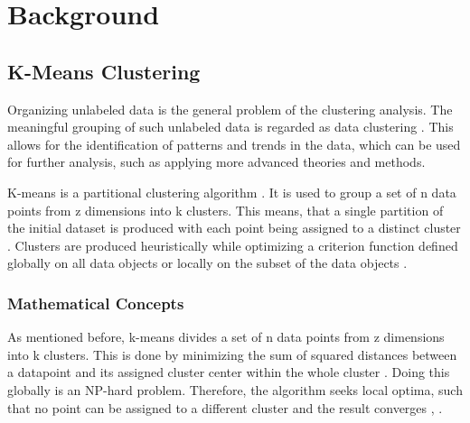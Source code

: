 \chapter{Background}
\label{cha:background}






%

\section{K-Means Clustering}
\label{sec:k_means_clustering}
Organizing unlabeled data \cite{EZU-CPF} is the general problem of the clustering analysis.
The meaningful grouping of such unlabeled data is regarded as data clustering \cite{ABI-RKC}.
This allows for the identification of patterns and trends in the data, which can be used for further analysis, such as applying more advanced theories and methods.

K-means is a partitional clustering algorithm \cite{SIN-UKC}.
It is used to group a set of n data points from z dimensions into k clusters.
This means, that a single partition of the initial dataset is produced with each point being assigned to a distinct cluster \cite{SIN-UKC}.
Clusters are produced heuristically while optimizing a criterion function defined globally on all data objects or locally on the subset of the data objects \cite{ZHU-EPC}.

\subsection{Mathematical Concepts}
As mentioned before, k-means divides a set of n data points from z dimensions into k clusters.
This is done by minimizing the sum of squared distances between a datapoint and its assigned cluster center within the whole cluster \cite{HAR-KMA}.
Doing this globally is an NP-hard problem.
Therefore, the algorithm seeks local optima, such that no point can be assigned to a different cluster and the result converges \cite{SEL-GCT}, \cite{HAR-KMA}.

